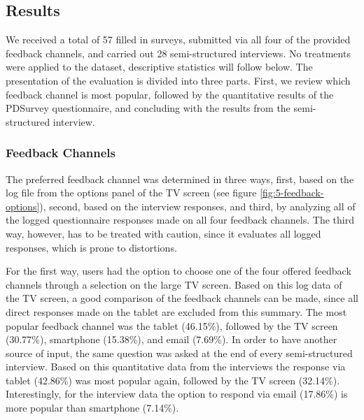 \clearpage
\subsection{Results}


	We received a total of 57 filled in surveys, submitted via all four of the provided feedback channels, and carried out 28 semi-structured interviews. No treatments were applied to the dataset, descriptive statistics will follow below. The presentation of the evaluation is divided into three parts. First, we review which feedback channel is most popular, followed by the quantitative results of the PDSurvey questionnaire, and concluding with the results from the semi-structured interview. 







	\subsubsection{Feedback Channels}
	\label{5:results:feedback-channels}

	The preferred feedback channel was determined in three ways, first, based on the log file from the options panel of the TV screen (see figure \ref{fig:5-feedback-options}), second, based on the interview responses, and third, by analyzing all of the logged questionnaire responses made on all four feedback channels. The third way, however, has to be treated with caution, since it evaluates all logged responses, which is prone to distortions.

	For the first way, users had the option to choose one of the four offered feedback channels through a selection on the large TV screen. Based on this log data of the TV screen, a good comparison of the feedback channels can be made, since all direct responses made on the tablet are excluded from this summary. The most popular feedback channel was the tablet (46.15\%), followed by the TV screen (30.77\%), smartphone (15.38\%), and email (7.69\%).
	In order to have another source of input, the same question was asked at the end of every semi-structured interview. Based on this quantitative data from the interviews the response via tablet (42.86\%) was most popular again, followed by the TV screen (32.14\%). Interestingly, for the interview data the option to respond via email (17.86\%) is more popular than smartphone (7.14\%). 
	

